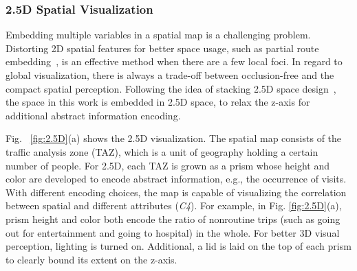 \documentclass{ieeeaccess}
\begin{document}
\subsubsection{2.5D Spatial Visualization}
\label{subsec:25D}

Embedding multiple variables in a spatial map is a challenging problem. Distorting 2D spatial features for better space usage, such as partial route embedding~\cite{sun2016embedding}, is an effective method when there are a few local foci. In regard to global visualization, there is always a trade-off between occlusion-free and the compact spatial perception. Following the idea of stacking 2.5D space design~\cite{Tominski2012_stacking}, the space in this work is embedded in 2.5D space, to relax the z-axis for additional abstract information encoding.

Fig. ~\ref{fig:2.5D}(a) shows the 2.5D visualization. The spatial map consists of the traffic analysis zone (TAZ), which is a unit of geography holding a certain number of people. For 2.5D, each TAZ is grown as a prism whose height and color are developed to encode abstract information, e.g., the occurrence of visits. With different encoding choices, the map is capable of visualizing the correlation between spatial and different attributes (\textit{C4}). For example, in Fig. \ref{fig:2.5D}(a), prism height and color both encode the ratio of nonroutine trips (such as going out for entertainment and going to hospital) in the whole. For better 3D visual perception, lighting is turned on. Additional, a lid is laid on the top of each prism to clearly bound its extent on the z-axis.
\end{document}
